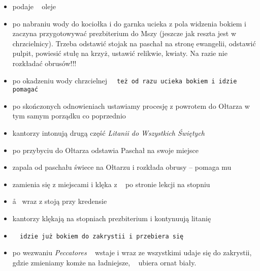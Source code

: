 \begin{itemize}
		\item {} podaje \ii~ oleje
		\item {} po nabraniu wody do kociołka i do garnka ucieka z pola widzenia bokiem i zaczyna przygotowywać prezbiterium do Mszy (jeszcze jak reszta jest w chrzcielnicy). Trzeba odstawić stojak na paschał na stronę ewangelii, odstawić pulpit, powiesić stułę na krzyż, ustawić relikwie, kwiaty. Na razie nie rozkładać obrusów!!! 
		\item po okadzeniu wody chrzcielnej \tt~ też od razu ucieka bokiem i idzie pomagać 
		\item po skończonych odnowieniach ustawiamy procesję z powrotem do Ołtarza w tym samym porządku co poprzednio
		\item kantorzy intonują drugą część \textit{Litanii do Wszystkich Świętych}
		\item po przybyciu do Ołtarza  odstawia Paschał na swoje miejsce
		\item {} zapala od paschału świece na Ołtarzu i rozkłada obrusy -- pomaga mu 
		\item {} zamienia się z  miejscami i klęka z \ii~ po stronie lekcji na stopniu
		\item \aa~ wraz z  stoją przy kredensie
		\item kantorzy klękają na stopniach prezbiterium i kontynuują litanię
		\item \tt~ idzie już bokiem do zakrystii i przebiera się
		\item po wezwaniu \textit{Peccatores} \ii~ wstaje i wraz ze wszystkimi udaje się do zakrystii, gdzie zmieniamy komże na ładniejsze, \ii~ ubiera ornat biały.
	\end{itemize}
	